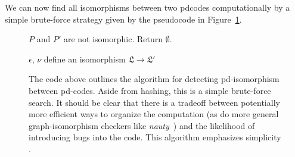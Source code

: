 \documentclass[amsmath,secnumarabic,floatfix,amssymb,nofootinbib,nobibnotes,letterpaper,11pt,tightenlines,showkeys]{revtex4}
\theoremstyle{definition}
\newcommand{\nauty}{\textit{nauty} }
\let\mgp=\marginpar \marginparwidth18mm \marginparsep1mm
\def\marginpar#1{\mgp{\raggedright\tiny #1}}
\let\lbl=\label
\def\label#1{\lbl{#1}\ifinner\else\marginpar{\ref{#1} #1}\ignorespaces\fi}
\begin{document}
We can now find all isomorphisms between two pdcodes computationally by a simple brute-force strategy given by the pseudocode in Figure~\ref{fig:pd isomorphic}.

\begin{figure}[ht]
\begin{algorithmic}

	\State $P$ and $P'$ are not isomorphic. Return $\emptyset$.
\EndIf

			\State $\epsilon$, $\nu$ define an isomorphism $\mathfrak{L} \rightarrow \mathfrak{L}'$
		\EndIf
		\EndIf
	\EndFor
\EndFor
\EndProcedure
\end{algorithmic}

\caption{The code above outlines the algorithm for detecting pd-isomorphism between pd-codes. Aside from hashing, this is a simple brute-force search. It should be clear that there is a tradeoff between potentially more efficient ways to organize the computation (as do more general graph-isomorphism checkers like \emph{nauty}~\cite{McKay201494}) and the likelihood of introducing bugs into the code. This algorithm emphasizes simplicity .}
\label{fig:pd isomorphic}
\end{figure}

\end{document}
